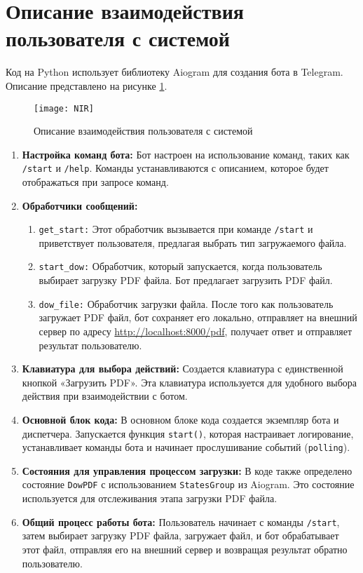 \section{Описание взаимодействия пользователя с системой}
Код на Python использует библиотеку Aiogram для создания бота в Telegram.
Описание представлено на рисунке \ref{NIRR}.
\begin{figure}
  \centering
  \texttt{[image: NIR]}
  \caption{Описание взаимодействия пользователя с системой}
  \label{NIRR}
\end{figure}
\begin{enumerate}[label=\textbf{\arabic*.}]
    \item \textbf{Настройка команд бота:}
        Бот настроен на использование команд, таких как \texttt{/start} и \texttt{/help}. Команды устанавливаются с описанием, которое будет отображаться при запросе команд.

    \item \textbf{Обработчики сообщений:}
        \begin{enumerate}[label=\textbf{\alph*.}]
            \item \texttt{get\_start:} Этот обработчик вызывается при команде \texttt{/start} и приветствует пользователя, предлагая выбрать тип загружаемого файла.
            
            \item \texttt{start\_dow:} Обработчик, который запускается, когда пользователь выбирает загрузку PDF файла. Бот предлагает загрузить PDF файл.
            
            \item \texttt{dow\_file:} Обработчик загрузки файла. После того как пользователь загружает PDF файл, бот сохраняет его локально, отправляет на внешний сервер по адресу \url{http://localhost:8000/pdf}, получает ответ и отправляет результат пользователю.
        \end{enumerate}

    \item \textbf{Клавиатура для выбора действий:}
        Создается клавиатура с единственной кнопкой «Загрузить PDF». Эта клавиатура используется для удобного выбора действия при взаимодействии с ботом.

    \item \textbf{Основной блок кода:}
        В основном блоке кода создается экземпляр бота и диспетчера. Запускается функция \texttt{start()}, которая настраивает логирование, устанавливает команды бота и начинает прослушивание событий (\texttt{polling}).

    \item \textbf{Состояния для управления процессом загрузки:}
        В коде также определено состояние \texttt{DowPDF} с использованием \texttt{StatesGroup} из Aiogram. Это состояние используется для отслеживания этапа загрузки PDF файла.

    \item \textbf{Общий процесс работы бота:}
        Пользователь начинает с команды \texttt{/start}, затем выбирает загрузку PDF файла, загружает файл, и бот обрабатывает этот файл, отправляя его на внешний сервер и возвращая результат обратно пользователю.
\end{enumerate}
